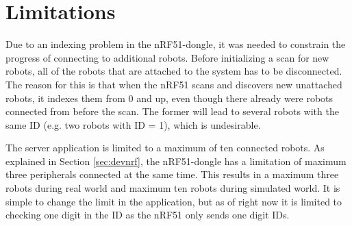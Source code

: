 \section{Limitations}
\label{secr:limitations}
Due to an indexing problem in the nRF51-dongle, it was needed to constrain the progress of connecting to additional robots. Before initializing a scan for new robots, all of the robots that are attached to the system has to be disconnected. The reason for this is that when the nRF51 scans and discovers new unattached robots, it indexes them from 0 and up, even though there already were robots connected from before the scan. The former will lead to several robots with the same ID (e.g. two robots with ID = 1), which is undesirable.

The server application is limited to a maximum of ten connected robots. As explained in Section \ref{sec:devnrf}, the nRF51-dongle has a limitation of maximum three peripherals connected at the same time. This results in a maximum three robots during real world and maximum ten robots during simulated world. It is simple to change the limit in the application, but as of right now it is limited to checking one digit in the ID as the nRF51 only sends one digit IDs.
